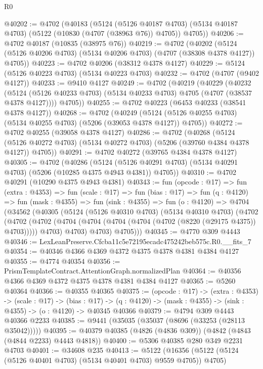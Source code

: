 \begin{lexlean}{R0}
\begin{coremodule}
@40202 := @4702
    (@40183
      (@5124
        (@5126 @40187 @4703)
        (@5134 @40187 @4703)
        (@5122 (@10830 (@4707 (@38963 @76)) @4705))
        @4705))
@40206 := @4702 @40187 (@10835 (@38975 @76))
@40219 := @4702
    (@40202 (@5124 (@5126 @40206 @4703) (@5134 @40206 @4703) (@4707 (@38308 @4378 @4127)) @4705))
@40223 := @4702 @40206 (@38312 @4378 @4127)
@40229 := @5124 (@5126 @40223 @4703) (@5134 @40223 @4703)
@40232 := @4702 (@4707 (@9402 @4127))
@40233 := @9410 @4127
@40249 := @4702
    (@40219
      (@40229
        (@40232
          (@5124 (@5126 @40233 @4703) (@5134 @40233 @4703) @4705 (@4707 (@38537 @4378 @4127))))
        @4705))
@40255 := @4702 @40223 (@6453 @40233 (@38541 @4378 @4127))
@40268 := @4702
    (@40249 (@5124 (@5126 @40255 @4703) (@5134 @40255 @4703) (@5206 (@39053 @4378 @4127)) @4705))
@40272 := @4702 @40255 (@39058 @4378 @4127)
@40286 := @4702
    (@40268
      (@5124 (@5126 @40272 @4703) (@5134 @40272 @4703) (@5206 (@39760 @4384 @4378 @4127)) @4705))
@40291 := @4702 @40272 (@39765 @4384 @4378 @4127)
@40305 := @4702
    (@40286
      (@5124 (@5126 @40291 @4703) (@5134 @40291 @4703) (@5206 (@10285 @4375 @4943 @4381)) @4705))
@40310 := @4702 @40291 (@10290 @4375 @4943 @4381)
@40343 := fun (opcode : @17) =>
  fun (extra : @4353) =>
  fun (scale : @17) =>
  fun (bias : @17) =>
  fun (q : @4120) =>
  fun (mask : @4355) =>
  fun (sink : @4355) =>
  fun (o : @4120) =>
  @4704
    (@34562
      (@40305
        (@5124
          (@5126 @40310 @4703)
          (@5134 @40310 @4703)
          (@4702
            (@4702
              (@4702 (@4704 (@4704 (@4704 (@4704 (@4702 (@8220 (@29175 @4375)) @4703))))) @4703)
              @4703)
            @4703)
          @4705)))
@40345 := @4770 @309 @4443
@40346 := LexLeanPreserve.Cfcba11c5e72195ecadc475242beb575c.R0.__fits_7
@40354 := @40346 @4366 @4369 @4372 @4375 @4378 @4381 @4384 @4127
@40355 := @4774 @40354
@40356 := PrismTemplateContract.AttentionGraph.normalizedPlan
@40364 := @40356 @4366 @4369 @4372 @4375 @4378 @4381 @4384 @4127
@40365 := @5260 @40364
@40366 := @40355 @40365
@40375 := (opcode : @17) ->
  (extra : @4353) ->
  (scale : @17) ->
  (bias : @17) -> (q : @4120) -> (mask : @4355) -> (sink : @4355) -> (o : @4120) -> @40345 @40366
@40379 := @4794 @309 @4443 @40366 @2233
@40385 := @9441 (@35035 (@35037 (@8696 (@33253 (@28113 @35042)))))
@40395 := @40379 @40385 (@4826 (@4836 @309)) (@4842 (@4843 (@4844 @2233) @4443 @4818))
@40400 := @5306 @40385 @280 @349 @2231 @4703
@40401 := @34608 @235
@40413 := @5122 (@16356 (@5122 (@5124 (@5126 @40401 @4703) (@5134 @40401 @4703) @9559 @4705)) @4705)

\end{coremodule}
\end{lexlean}
